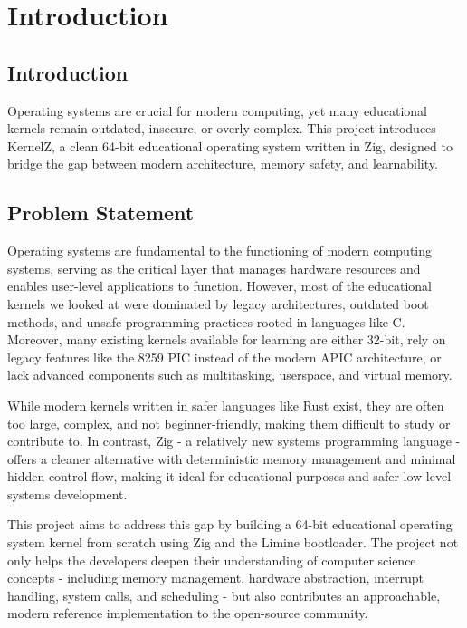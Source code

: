 \documentclass[12pt]{extarticle}
\begin{document}
\section{Introduction}
\subsection{Introduction}
Operating systems are crucial for modern computing, yet many educational kernels remain outdated, insecure, or overly complex. This project introduces KernelZ, a clean 64-bit educational operating system written in Zig, designed to bridge the gap between modern architecture, memory safety, and learnability.

\subsection{Problem Statement}
Operating systems are fundamental to the functioning of modern computing
systems, serving as the critical layer that manages hardware resources and
enables user-level applications to function. However, most of the educational
kernels we looked at were dominated by legacy architectures, outdated boot
methods, and unsafe programming practices rooted in languages like C. Moreover,
many existing kernels available for learning are either 32-bit, rely on legacy
features like the 8259 PIC instead of the modern APIC architecture, or lack
advanced components such as multitasking, userspace, and virtual memory.

While modern kernels written in safer languages like Rust exist, they are often
too large, complex, and not beginner-friendly, making them difficult to study or
contribute to. In contrast, Zig - a relatively new systems programming language
- offers a cleaner alternative with deterministic memory management and minimal
hidden control flow, making it ideal for educational purposes and safer
low-level systems development.

This project aims to address this gap by building a 64-bit educational operating
system kernel from scratch using Zig and the Limine bootloader. The project not
only helps the developers deepen their understanding of computer science
concepts - including memory management, hardware abstraction, interrupt
handling, system calls, and scheduling - but also contributes an approachable,
modern reference implementation to the open-source community.

\pagebreak
\end{document}
